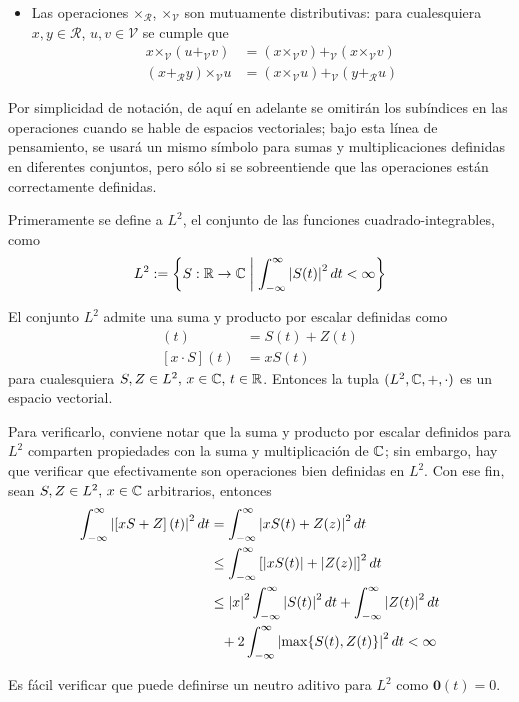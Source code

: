 \begin{definicion}
\begin{itemize}
\item Las operaciones $\boldsymbol{\times}_\mathcal{R}$, $\boldsymbol{\times}_\mathcal{V}$ son mutuamente distributivas: para cualesquiera $x, y \in \mathcal{R}$, $u, v \in \mathcal{V}$ se cumple que
\begin{align*}
x \boldsymbol{\times}_\mathcal{V} (u \boldsymbol{+}_\mathcal{V} v) &= (x \boldsymbol{\times}_\mathcal{V} v ) \boldsymbol{+}_\mathcal{V} (x \boldsymbol{\times}_\mathcal{V} v) \\
(x \boldsymbol{+}_\mathcal{R} y) \boldsymbol{\times}_\mathcal{V} u &= (x \boldsymbol{\times}_\mathcal{V} u ) \boldsymbol{+}_\mathcal{V} ( y \boldsymbol{+}_\mathcal{R} u)
\end{align*}
\end{itemize}
\end{definicion}

Por simplicidad de notación, de aquí en adelante se omitirán los subíndices en las operaciones cuando se hable de espacios vectoriales;
bajo esta línea de pensamiento, se usará un mismo símbolo para sumas y multiplicaciones definidas en diferentes conjuntos, pero sólo si se sobreentiende que las operaciones están correctamente definidas.

\begin{ejemplo}
Primeramente se define a $L^2$, el conjunto de las funciones cuadrado-integrables, como
\begin{equation}
L^2 := \left\{ S: \mathbb{R}\rightarrow\mathbb{C} \mathrel{}\middle|\mathrel{} \int_{-\infty}^{\infty} \left| S(t) \right|^2 dt < \infty \right\}
\end{equation}

El conjunto $L^2$ admite una suma y producto por escalar definidas como
\begin{align}
[S+Z](t) &= S(t) + Z(t) \\
[x\cdot S](t) &= x S(t)
\end{align}
para cualesquiera $S, Z \in L^{2}, \, x\in \mathbb{C}, \, t\in \mathbb{R}$. 
%
Entonces la tupla $(L^{2}, \mathbb{C},+,\cdot)$ es un espacio vectorial.

Para verificarlo, conviene notar que la suma y producto por escalar definidos para $L^{2}$ comparten propiedades con la suma y multiplicación de $\mathbb{C}$; sin embargo, hay que verificar que efectivamente son operaciones bien definidas en $L^{2}$.
%
Con ese fin, sean $S, Z \in L^{2}, \, x \in \mathbb{C}$ arbitrarios, entonces
\begin{align*}
\intR \abso{\left[x S + Z\right]\left(t\right)}^2 dt 
&= 
\intR \abso{ xS(t) + Z(z)}^2 dt \\
&\leq
\intR \left[ \abso{ xS(t)} + \abso{ Z(z)} \right]^2 dt \\
&\leq
\abso{x}^{2} \intR \abso{ S(t)}^{2} dt + \intR \abso{ Z(t)}^{2} dt \\
&\pheq
+ 2\intR \abso{ \max\{ S(t), Z(t) \} }^{2} dt < \infty
\end{align*}

Es fácil verificar que puede definirse un neutro aditivo para $L^{2}$ como $\boldsymbol{0}(t) = 0$.
\end{ejemplo}

